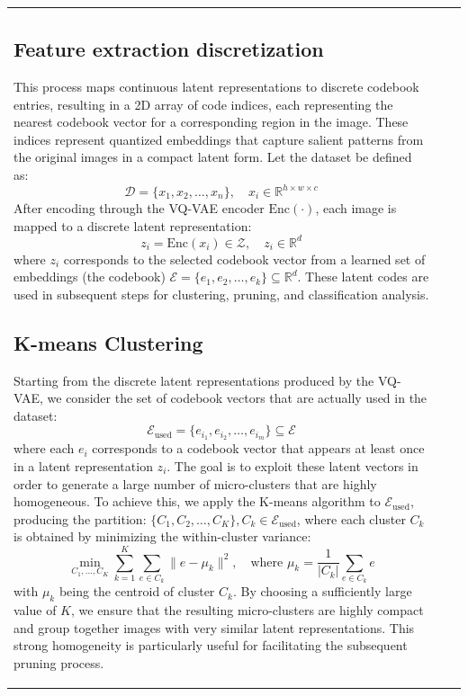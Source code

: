 \documentclass[twocolumn]{svjour3}
\begin{document}
\begin{table}[htbp]
\begin{tabular}{lll}
\subsection{Feature extraction discretization}
This process maps continuous latent representations to discrete codebook entries, resulting in a 2D array of code indices, each representing the nearest codebook vector for a corresponding region in the image. These indices represent quantized embeddings that capture salient patterns from the original images in a compact latent form. Let the dataset be defined as:
\begin{equation}
\mathcal{D} = \{ x_1, x_2, \dots, x_n \}, \quad x_i \in \mathbb{R}^{h \times w \times c}
\end{equation}
After encoding through the VQ-VAE encoder $\text{Enc}(\cdot)$, each image is mapped to a discrete latent representation:
\begin{equation}
z_i = \text{Enc}(x_i) \in \mathcal{Z}, \quad z_i \in \mathbb{R}^d
\end{equation}
where $z_i$ corresponds to the selected codebook vector from a learned set of embeddings (the codebook) $\mathcal{E} = \{ e_1, e_2, \dots, e_k \} \subseteq \mathbb{R}^d$. These latent codes are used in subsequent steps for clustering, pruning, and classification analysis.
\subsection{K-means Clustering}
Starting from the discrete latent representations produced by the VQ-VAE, we consider the set of codebook vectors that are actually used in the dataset:
\begin{equation}
\mathcal{E}_{\text{used}} = \{ e_{i_1}, e_{i_2}, \dots, e_{i_m} \} \subseteq \mathcal{E}
\end{equation}
where each $e_i$ corresponds to a codebook vector that appears at least once in a latent representation $z_i$.
The goal is to exploit these latent vectors in order to generate a large number of micro-clusters that are highly homogeneous. To achieve this, we apply the K-means algorithm to $\mathcal{E}_{\text{used}}$, producing the partition: $\{ C_1, C_2, \dots, C_K \}, C_k \in \mathcal{E}_{\text{used}}$, where each cluster $C_k$ is obtained by minimizing the within-cluster variance:
\begin{equation}
\min_{C_1, \dots, C_K} \sum_{k=1}^K \sum_{e \in C_k} \| e - \mu_k \|^2, \quad \text{where } \mu_k = \frac{1}{|C_k|} \sum_{e \in C_k} e
\end{equation}
with $\mu_k$ being the centroid of cluster $C_k$. By choosing a sufficiently large value of $K$, we ensure that the resulting micro-clusters are highly compact and group together images with very similar latent representations. This strong homogeneity is particularly useful for facilitating the subsequent pruning process.

\end{tabular}
\end{table}
\end{document}
